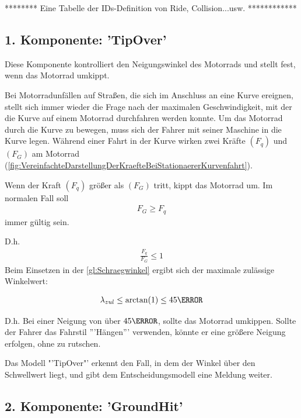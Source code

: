 ******** Eine Tabelle der IDs-Definition von Ride, Collision...usw. ************

\subsection{1. Komponente: 'TipOver'}
%
%
%
%
Diese Komponente kontrolliert den Neigungswinkel des Motorrads und stellt fest, wenn das Motorrad umkippt.

Bei Motorradunfällen auf Straßen, die sich im Anschluss an eine Kurve ereignen, stellt sich immer wieder die Frage nach der maximalen Geschwindigkeit, mit der die Kurve auf einem Motorrad durchfahren werden konnte.
Um das Motorrad durch die Kurve zu bewegen, muss sich der Fahrer mit seiner Maschine in die Kurve legen. Während einer Fahrt in der Kurve wirken zwei Kräfte $(F_q)$ und $(F_G)$ am Motorrad (\autoref{fig:VereinfachteDarstellungDerKraefteBeiStationaererKurvenfahrt}).

Wenn der Kraft $(F_q)$ größer als $(F_G)$ tritt, kippt das Motorrad um. Im normalen Fall soll
\begin{align*}
	F_G \geq F_q
\end{align*}
immer gültig sein.

D.h. 
\begin{align*}
	\frac{F_q}{F_G} \leq 1
\end{align*}
Beim Einsetzen in der \autoref{gl:Schraegwinkel} ergibt sich der maximale zulässige Winkelwert:

\begin{align*}
	\lambda_{zul} \leq \arctan(1) \leq 45 \degree
\end{align*}

D.h. Bei einer Neigung von über $45\degree$, sollte das Motorrad umkippen. Sollte der Fahrer das Fahrstil '''Hängen''' verwenden, könnte er eine größere Neigung erfolgen, ohne zu rutschen.

Das Modell "'TipOver"' erkennt den Fall, in dem der Winkel über den Schwellwert liegt, und gibt dem Entscheidungsmodell eine Meldung weiter.



\subsection{2. Komponente: 'GroundHit'}
%
%
%
%

